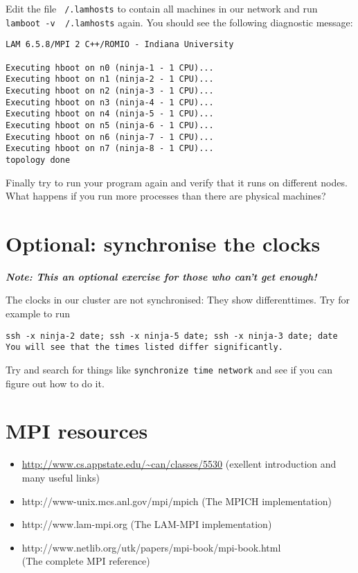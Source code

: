 \documentclass[12pt]{article}
\begin{document}
Edit the file \texttt{~/.lamhosts} to contain all machines in our network
and run \texttt{lamboot -v ~/.lamhosts} again. You should see the following 
diagnostic message:
\begin{verbatim} 
LAM 6.5.8/MPI 2 C++/ROMIO - Indiana University

Executing hboot on n0 (ninja-1 - 1 CPU)...
Executing hboot on n1 (ninja-2 - 1 CPU)...
Executing hboot on n2 (ninja-3 - 1 CPU)...
Executing hboot on n3 (ninja-4 - 1 CPU)...
Executing hboot on n4 (ninja-5 - 1 CPU)...
Executing hboot on n5 (ninja-6 - 1 CPU)...
Executing hboot on n6 (ninja-7 - 1 CPU)...
Executing hboot on n7 (ninja-8 - 1 CPU)...
topology done
\end{verbatim}
\noindent Finally try to run your program again and verify that it runs 
on different nodes.
What happens if you run more processes than there are physical machines?

       
\section*{Optional: synchronise the clocks}

\textbf{\emph{Note: This an optional exercise for those who can't get enough!}}

The clocks in our cluster are not synchronised: They show differenttimes.
Try for example to run
\begin{verbatim}
ssh -x ninja-2 date; ssh -x ninja-5 date; ssh -x ninja-3 date; date
You will see that the times listed differ significantly.
\end{verbatim}

Try and search for things like
\texttt{synchronize time network}
and see if you can figure out how to do it.


\section*{MPI resources}

\begin{itemize} 
  \item \url{http://www.cs.appstate.edu/~can/classes/5530} (exellent introduction 
  and many useful links)
  \item http://www-unix.mcs.anl.gov/mpi/mpich (The MPICH implementation)
  \item http://www.lam-mpi.org (The LAM-MPI implementation)
  \item http://www.netlib.org/utk/papers/mpi-book/mpi-book.html\\
    (The complete MPI reference)
\end{itemize} 
\end{document}
